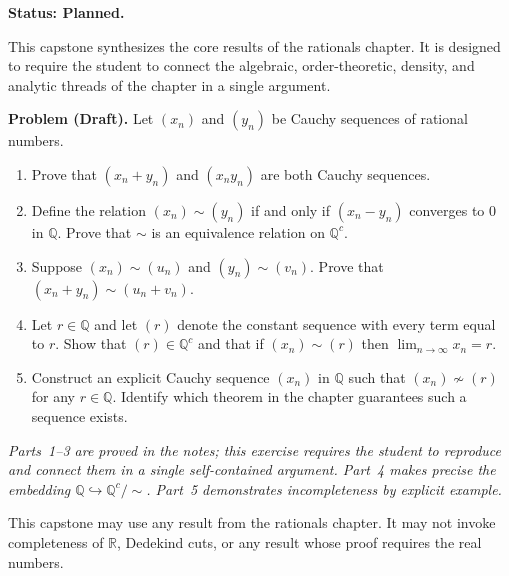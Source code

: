 
\newpage
{}
\label{cap:rationals}

\begin{tcolorbox}[
  colback=gray!6,
  colframe=gray!40,
  arc=2pt,
  left=8pt, right=8pt, top=6pt, bottom=6pt,
  title={\small\textbf{Capstone --- Rational Numbers}},
  fonttitle=\small\bfseries
]
\textbf{Status: Planned.}

This capstone synthesizes the core results of the rationals chapter.  It is
designed to require the student to connect the algebraic, order-theoretic,
density, and analytic threads of the chapter in a single argument.

\medskip

\textbf{Problem (Draft).}
Let $(x_n)$ and $(y_n)$ be Cauchy sequences of rational numbers.

\begin{enumerate}
  \item Prove that $(x_n + y_n)$ and $(x_n y_n)$ are both Cauchy sequences.
  \item Define the relation $(x_n) \sim (y_n)$ if and only if
        $(x_n - y_n)$ converges to $0$ in $\mathbb{Q}$.
        Prove that $\sim$ is an equivalence relation on $\mathbb{Q}^c$.
  \item Suppose $(x_n) \sim (u_n)$ and $(y_n) \sim (v_n)$.
        Prove that $(x_n + y_n) \sim (u_n + v_n)$.
  \item Let $r \in \mathbb{Q}$ and let $(r)$ denote the constant sequence
        with every term equal to $r$.  Show that $(r) \in \mathbb{Q}^c$
        and that if $(x_n) \sim (r)$ then $\lim_{n \to \infty} x_n = r$.
  \item Construct an explicit Cauchy sequence $(x_n)$ in $\mathbb{Q}$ such
        that $(x_n) \not\sim (r)$ for any $r \in \mathbb{Q}$.  Identify
        which theorem in the chapter guarantees such a sequence exists.
\end{enumerate}

\medskip
\textit{Parts~1--3 are proved in the notes; this exercise requires the student
to reproduce and connect them in a single self-contained argument.
Part~4 makes precise the embedding $\mathbb{Q} \hookrightarrow \mathbb{Q}^c/{\sim}$.
Part~5 demonstrates incompleteness by explicit example.}

\end{tcolorbox}

\begin{remark*}
This capstone may use any result from the rationals chapter.
It may not invoke completeness of $\mathbb{R}$, Dedekind cuts,
or any result whose proof requires the real numbers.
\end{remark*}
